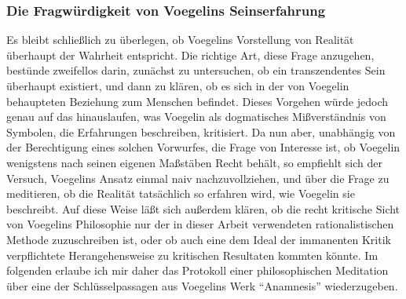 
\subsubsection{Die Fragwürdigkeit von Voegelins Seinserfahrung} 

Es bleibt schließlich zu überlegen, ob Voegelins Vorstellung von Realität
überhaupt der Wahrheit entspricht. Die richtige Art, diese Frage anzugehen,
bestünde zweifellos darin, zunächst zu untersuchen, ob ein transzendentes Sein
überhaupt existiert, und dann zu klären, ob es sich in der von Voegelin
behaupteten Beziehung zum Menschen befindet. Dieses Vorgehen würde jedoch
genau auf das hinauslaufen, was Voegelin als dogmatisches Mißverständnis von
Symbolen, die Erfahrungen beschreiben, kritisiert. Da nun aber, unabhängig von
der Berechtigung eines solchen Vorwurfes, die Frage von Interesse ist, ob
Voegelin wenigstens nach seinen eigenen Maßstäben Recht behält, so empfiehlt
sich der Versuch, Voegelins Ansatz einmal naiv nachzuvollziehen, und über die
Frage zu meditieren, ob die Realität tatsächlich so erfahren wird, wie
Voegelin sie beschreibt. Auf diese Weise läßt sich außerdem klären, ob die
recht kritische Sicht von Voegelins Philosophie nur der in dieser Arbeit
verwendeten rationalistischen Methode zuzuschreiben ist, oder ob auch eine dem
Ideal der immanenten Kritik verpflichtete Herangehensweise zu kritischen
Resultaten kommten könnte. Im folgenden erlaube ich mir daher das Protokoll
einer philosophischen Meditation über eine der Schlüsselpassagen aus Voegelins
Werk "`Anamnesis"' wiederzugeben. 

